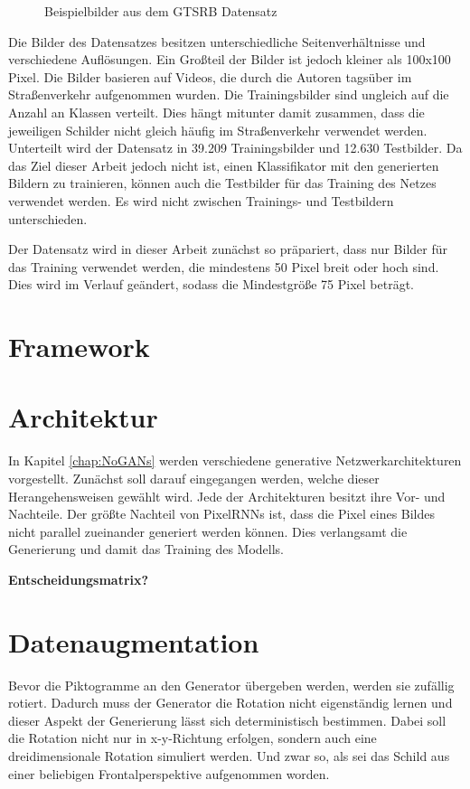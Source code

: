 \begin{figure}[H]
\begin{subfigure}[b]{0.125\textwidth}
    \caption{}
    \label{fig:gtrsb-paper-bsp-image-4}
\end{subfigure}
      \caption{Beispielbilder aus dem \acs{GTSRB} Datensatz \cite{GTSRB}}
      \label{fig:gtrsb-paper-bsp-images}
\end{figure}

Die Bilder des Datensatzes besitzen unterschiedliche Seitenverhältnisse und verschiedene Auflösungen. Ein Großteil der Bilder ist jedoch kleiner als 100x100 Pixel. Die Bilder basieren auf Videos, die durch die Autoren tagsüber im Straßenverkehr aufgenommen wurden. Die Trainingsbilder sind ungleich auf die Anzahl an Klassen verteilt. Dies hängt mitunter damit zusammen, dass die jeweiligen Schilder nicht gleich häufig im Straßenverkehr verwendet werden. Unterteilt wird der Datensatz in 39.209 Trainingsbilder und 12.630 Testbilder. Da das Ziel dieser Arbeit jedoch nicht ist, einen Klassifikator mit den generierten Bildern zu trainieren, können auch die Testbilder für das Training des Netzes verwendet werden. Es wird nicht zwischen Trainings- und Testbildern unterschieden. \cite{GTSRB}

Der Datensatz wird in dieser Arbeit zunächst so präpariert, dass nur Bilder für das Training verwendet werden, die mindestens 50 Pixel breit oder hoch sind. Dies wird im Verlauf geändert, sodass die Mindestgröße 75 Pixel beträgt.
\section{Framework}
\section{Architektur}
In Kapitel \ref{chap:NoGANs} werden verschiedene generative Netzwerkarchitekturen vorgestellt. Zunächst soll darauf eingegangen werden, welche dieser Herangehensweisen gewählt wird. Jede der Architekturen besitzt ihre Vor- und Nachteile. Der größte Nachteil von \acp{PixelRNN} ist, dass die Pixel eines Bildes nicht parallel zueinander generiert werden können. Dies verlangsamt die Generierung und damit das Training des Modells.

\textbf{Entscheidungsmatrix?}

\section{Datenaugmentation}
Bevor die Piktogramme an den Generator übergeben werden, werden sie zufällig rotiert. Dadurch muss der Generator die Rotation nicht eigenständig lernen und dieser Aspekt der Generierung lässt sich deterministisch bestimmen. Dabei soll die Rotation nicht nur in x-y-Richtung erfolgen, sondern auch eine dreidimensionale Rotation simuliert werden. Und zwar so, als sei das Schild aus einer beliebigen Frontalperspektive aufgenommen worden.

